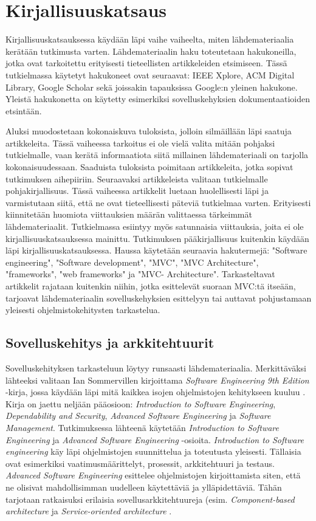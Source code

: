 \documentclass[utf8]{gradu3}
\begin{document}
\chapter{Kirjallisuuskatsaus}

Kirjallisuuskatsauksessa käydään läpi vaihe vaiheelta, miten
lähdemateriaalia kerätään tutkimusta varten. Lähdemateriaalin 
haku toteutetaan hakukoneilla, jotka ovat tarkoitettu erityisesti 
tieteellisten artikkeleiden etsimiseen. Tässä tutkielmassa käytetyt 
hakukoneet ovat seuraavat: IEEE Xplore, ACM Digital Library, 
Google Scholar sekä joissakin tapauksissa Google:n yleinen
hakukone. Yleistä hakukonetta on käytetty esimerkiksi
sovelluskehyksien dokumentaatioiden etsintään.

Aluksi muodostetaan kokonaiskuva tuloksista, jolloin silmäillään läpi
saatuja artikkeleita. Tässä vaiheessa tarkoitus ei ole vielä valita
mitään pohjaksi tutkielmalle, vaan kerätä informaatiota siitä
millainen lähdemateriaali on tarjolla kokonaisuudessaan. Saaduista 
tuloksista poimitaan artikkeleita, jotka sopivat tutkimuksen aihepiiriin.
Seuraavaksi artikkeleista valitaan tutkielmalle
pohjakirjallisuus. Tässä vaiheessa artikkelit luetaan huolellisesti
läpi ja varmistutaan siitä, että ne ovat tieteellisesti päteviä
tutkielmaa varten. Erityisesti kiinnitetään huomiota viittauksien
määrän valittaessa tärkeimmät lähdemateriaalit. Tutkielmassa esiintyy myös satunnaisia viittauksia,
joita ei ole kirjallisuuskatsauksessa mainittu. Tutkimuksen
pääkirjallisuus kuitenkin käydään läpi kirjallisuuskatsauksessa.
Haussa käytetään seuraavia hakutermejä: "Software engineering", "Software development", "MVC", "MVC Architecture",
"frameworks", "web frameworks" ja  "MVC- Architecture".
Tarkasteltavat artikkelit rajataan kuitenkin niihin,
jotka esittelevät suoraan MVC:tä itseään, tarjoavat
lähdemateriaalin sovelluskehyksien esittelyyn tai auttavat pohjustamaan yleisesti ohjelmistokehitysten tarkastelua.

\section{Sovelluskehitys ja arkkitehtuurit}
Sovelluskehityksen tarkasteluun löytyy runsaasti lähdemateriaalia. Merkittäväksi lähteeksi valitaan Ian Sommervillen kirjoittama \textit{Software Engineering 9th Edition} -kirja, jossa käydään läpi mitä kaikkea isojen ohjelmistojen kehitykseen kuuluu \parencite{Sommerville}. Kirja on jaettu neljään pääosioon: \textit{Introduction to Software Engineering}, \textit{Dependability and Security}, \textit{Advanced Software Engineering} ja \textit{Software Management}. Tutkimuksessa lähteenä käytetään \textit{Introduction to Software Engineering} ja \textit{Advanced Software Engineering} -osioita. \textit{Introduction to Software engineering} käy läpi ohjelmistojen suunnittelua ja toteutusta yleisesti. Tällaisia ovat esimerkiksi vaatimusmäärittelyt, prosessit, arkkitehtuuri ja testaus. \textit{Advanced Software Engineering} esittelee ohjelmistojen kirjoittamista siten, että ne olisivat mahdollisimman uudelleen käytettäviä ja ylläpidettäviä. Tähän tarjotaan ratkaisuksi erilaisia sovellusarkkitehtuureja (esim.  \textit{Component-based architecture} ja \textit{Service-oriented architecture} \parencite{Sommerville}.
\end{document}
